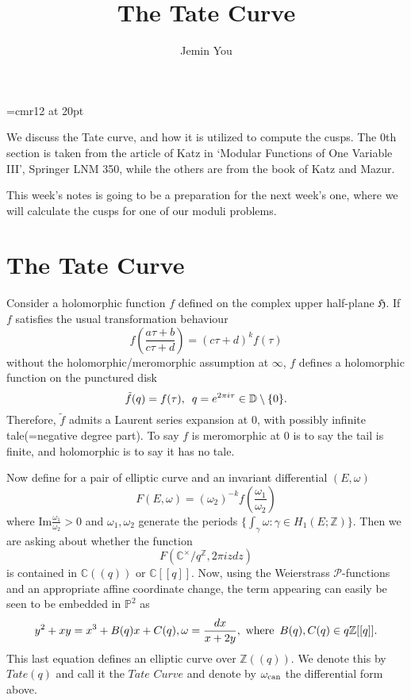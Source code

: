 \documentclass[a4paper,11pt]{article}
\begin{document}
\theoremstyle{plain}
\newtheorem{thm}{Theorem}[section]
\newtheorem{prp}[thm]{Proposition}
\newtheorem{lem}[thm]{Lemma}

\theoremstyle{definition}
\newtheorem{defn}[thm]{Definition}
\newtheorem{exm}[thm]{Example}
\newtheorem{nota}[thm]{Notation}

\theoremstyle{remark}
\newtheorem{rem}[thm]{Remark}



\font\myfont=cmr12 at 20pt

\title{\vspace{-5ex} \myfont The Tate Curve}
\author{Jemin You}
\date{\vspace{-5ex}}
\maketitle

\setcounter{section}{-1}

We discuss the Tate curve, and how it is utilized to compute the cusps.
The 0th section is taken from the article of Katz in `Modular Functions of One Variable III', Springer LNM 350, while the others are from the book of Katz and Mazur.

This week's notes is going to be a preparation for the next week's one, where we will calculate the cusps for one of our moduli problems.

\section{The Tate Curve}

Consider a holomorphic function $f$ defined on the complex upper half-plane $\mathfrak{H}$.
If $f$ satisfies the usual transformation behaviour
\[
f(\frac{a\tau+b}{c\tau+d})=(c\tau+d)^kf(\tau)
\]
without the holomorphic/meromorphic assumption at $\infty$, $f$ defines a holomorphic function on the punctured disk
\[
\tilde{f}(q)=f(\tau), \enskip q=e^{2\pi i\tau}\in\mathbb{D}\setminus\{0\}.
\]
Therefore, $\tilde{f}$ admits a Laurent series expansion at $0$, with possibly infinite tale(=negative degree part).
To say $f$ is meromorphic at $0$ is to say the tail is finite, and holomorphic is to say it has no tale.

Now define for a pair of elliptic curve and an invariant differential $(E,\omega)$
\[
F(E,\omega)=(\omega_2)^{-k}f(\frac{\omega_1}{\omega_2})
\]
where Im$\frac{\omega_1}{\omega_2}>0$ and $\omega_1,\omega_2$ generate the periods $\{\int_{\gamma}\omega:\gamma\in$$H_1(E;\mathbb{Z})\}$.
Then we are asking about whether the function
\[
F(\mathbb{C}^{\times}/q^{\mathbb{Z}},2\pi izdz)
\]
is contained in $\mathbb{C}((q))$ or $\mathbb{C}[[q]]$.
Now, using the Weierstrass $\mathcal{P}$-functions and an appropriate affine coordinate change, the term appearing can easily be seen to be embedded in $\mathbb{P}^2$ as
\[
y^2+xy=x^3+B(q)x+C(q), \omega=\frac{dx}{x+2y}, \textnormal{ where}\enskip B(q), C(q) \in q\mathbb{Z}[[q]].
\]
This last equation defines an elliptic curve over $\mathbb{Z}((q))$.
We denote this by $Tate(q)$ and call it the $\textit{Tate Curve}$ and denote by $\omega_{\textnormal{can}}$ the differential form above.
\end{document}

